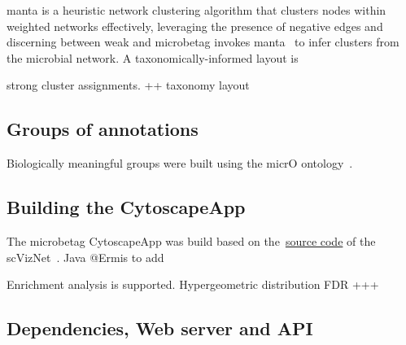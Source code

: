 \documentclass[sn-mathphys,Numbered, lineno]{sn-jnl}  %
\theoremstyle{thmstyleone}%
\theoremstyle{thmstyletwo}%
\theoremstyle{thmstylethree}%
\begin{document}
        manta is a heuristic network clustering algorithm that clusters nodes within weighted networks effectively, leveraging the presence of negative edges and discerning between weak and 
        microbetag invokes manta~\cite{rottjers2020manta} to infer clusters from the microbial network.
        A taxonomically-informed layout is 

        strong cluster assignments.
        ++ taxonomy layout 
        




    \subsection*{ Groups of annotations }
    \label{groups}

        Biologically meaningful groups were built using the micrO ontology~\cite{blank2016micro}.





    \subsection*{ Building the CytoscapeApp }
    \label{subsec:build-cytoapp}

        The microbetag CytoscapeApp was build based on the~\href{https://github.com/RBVI/scNetViz}{source code} of the scVizNet~\cite{choudhary2021scnetviz}.
        Java 
        @Ermis to add 
        

        Enrichment analysis is supported. 
        Hypergeometric distribution
        FDR +++




    \subsection*{ Dependencies, Web server and API }
    \label{subsec:webserver}
\end{document}
